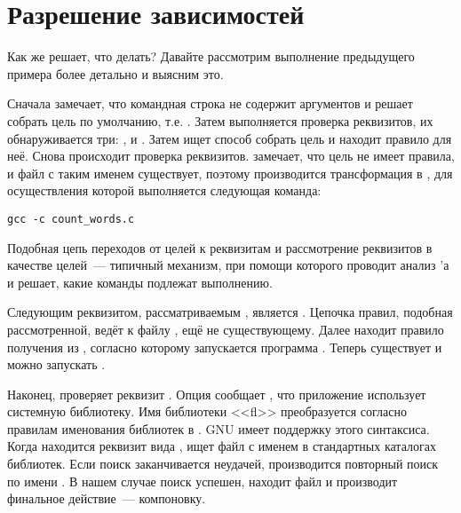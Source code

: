 \section{Разрешение зависимостей}

Как же \GNUmake{} решает, что делать? Давайте рассмотрим выполнение
предыдущего примера более детально и выясним это.

Сначала \GNUmake{} замечает, что командная строка не содержит
аргументов и решает собрать цель по умолчанию, т.е.
. Затем выполняется проверка реквизитов, их
обнаруживается три: ,  и
.  Затем \GNUmake{} ищет способ собрать цель
 и находит правило для неё. Снова происходит
проверка реквизитов. \GNUmake{} замечает, что цель
 не имеет правила, и файл с таким именем
существует, поэтому производится трансформация
 в , для
осуществления которой выполняется следующая команда:

{\footnotesize
\begin{verbatim}
gcc -c count_words.c
\end{verbatim}
}

Подобная цепь переходов от целей к реквизитам и рассмотрение
реквизитов в качестве целей~--- типичный механизм, при помощи которого
\GNUmake{} проводит анализ \Makefile{}'а и решает, какие команды
подлежат выполнению.

Следующим реквизитом, рассматриваемым \GNUmake{}, является
. Цепочка правил, подобная рассмотренной, ведёт к
файлу , ещё не существующему. Далее \GNUmake{}
находит правило получения  из ,
согласно которому запускается программа .
Теперь  существует и можно запускать .

Наконец, \GNUmake{} проверяет реквизит . Опция
 сообщает , что приложение использует
системную библиотеку. Имя библиотеки <<fl>> преобразуется согласно
правилам именования библиотек в . GNU \GNUmake{}
имеет поддержку этого синтаксиса. Когда находится реквизит вида
, \GNUmake{} ищет файл с именем
 в стандартных каталогах библиотек. Если поиск
заканчивается неудачей, производится повторный поиск по имени
.  В нашем случае поиск успешен, \GNUmake{}
находит файл  и производит финальное
действие~--- компоновку.
